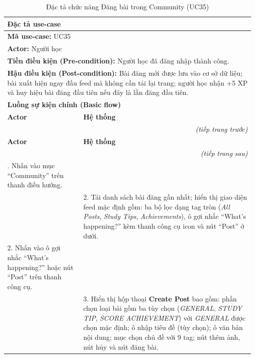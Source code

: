 \begin{longtable}{|p{\tbu}|p{\tbu}|}
    \caption{Đặc tả chức năng Đăng bài trong Community (UC35)} \label{tab:uc35_spec} \\
    
    \hline
    \multicolumn{2}{|l|}{\textbf{Đặc tả use-case}} \\ \hline
    \multicolumn{2}{|l|}{\textbf{Mã use-case:} UC35} \\ \hline
    \multicolumn{2}{|l|}{\textbf{Actor:} Người học} \\ \hline
    \multicolumn{2}{|p{\dimexpr\linewidth - 2\tabcolsep - 2\arrayrulewidth\relax}|}{\textbf{Tiền điều kiện (Pre-condition):} Người học đã đăng nhập thành công.} \\ \hline
    \multicolumn{2}{|p{\dimexpr\linewidth - 2\tabcolsep - 2\arrayrulewidth\relax}|}{\textbf{Hậu điều kiện (Post-condition):} Bài đăng mới được lưu vào cơ sở dữ liệu; bài xuất hiện ngay đầu feed mà không cần tải lại trang; người học nhận +5 XP và huy hiệu bài đăng đầu tiên nếu đây là lần đăng đầu tiên.} \\ \hline
    \multicolumn{2}{|l|}{\textbf{Luồng sự kiện chính (Basic flow)}} \\ \hline
    \textbf{Actor} & \textbf{Hệ thống} \\ \hline
    \endfirsthead
    \multicolumn{2}{r}{\textit{(tiếp trang trước)}} \\
    \hline
    \textbf{Actor} & \textbf{Hệ thống} \\ \hline
    \endhead
    \hline
    \multicolumn{2}{r}{\textit{(tiếp trang sau)}} \\
    \endfoot
    \endlastfoot
    1. Nhấn vào mục ``Community'' trên thanh điều hướng. & \\ \hline
    & 2. Tải danh sách bài đăng gần nhất; hiển thị giao diện feed mặc định gồm: ba bộ lọc dạng tag tròn (\textit{All Posts}, \textit{Study Tips}, \textit{Achievements}), ô gợi nhắc ``What's happening?'' kèm thanh công cụ icon và nút ``Post'' ở dưới. \\ \hline
    2. Nhấn vào ô gợi nhắc ``What's happening?'' hoặc nút ``Post'' trên thanh công cụ. & \\ \hline
    & 3. Hiển thị hộp thoại \textbf{Create Post} bao gồm: phần chọn loại bài gồm ba tùy chọn (\textit{GENERAL}, \textit{STUDY TIP}, \textit{SCORE ACHIEVEMENT}) với \textit{GENERAL} được chọn mặc định; ô nhập tiêu đề (tùy chọn); ô văn bản nội dung; mục chọn chủ đề với 9 tag; nút thêm ảnh, nút hủy và nút đăng bài. \\ \hline

\end{longtable}
